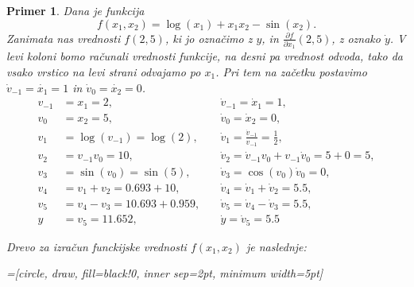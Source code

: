 \documentclass[12pt,slovene]{article}
\newtheorem{primer}{Primer}
\begin{document}
\begin{primer}\label{260522-0821}
Dana je funkcija
    $$f(x_{1},x_{2})=\log(x_{1})+x_{1}x_{2}-\sin(x_{2}).$$ 
Zanimata nas vrednosti $f(2,5)$, ki jo označimo z $y$, in $\frac{\partial{f}}{\partial{x_{1}}}(2,5)$, z oznako $\dot{y}$.
V levi koloni bomo računali vrednosti funkcije, na desni pa vrednost odvoda, tako da vsako vrstico na levi strani odvajamo po $x_1$. Pri tem na začetku postavimo 
$\dot{v}_{-1}=\dot{x_1}=1$ in $\dot{v}_0=\dot{x_2}=0$.
\begin{align*}
    v_{-1}  &=x_{1}   
    =2,\quad
    &\dot{v}_{-1}
            =\dot{x}_{1}  =1,\\
    v_{0}     &= x_{2}  =5,\quad
    &\dot{v}_{0}= \dot{x}_{2} =0,\\
    v_{1}     &= \log(v_{-1})  =\log(2),\quad
    &\dot{v}_{1}= \frac{\dot{v}_{-1}}{v_{-1}}                =\frac{1}{2},\\
    v_{2}     &= v_{-1}v_{0}  =10,\quad
    &\dot{v}_{2}= \dot{v}_{-1} v_{0}+
                v_{-1}\dot{v}_{0} 
                =5+0=5,\\
    v_{3}     &= \sin(v_0)  =\sin(5),\quad
    &\dot{v}_{3}= \cos(v_0)\dot{v}_0 =0,\\
    v_{4}     &= v_1+v_2  =0.693+10,\quad
    &\dot{v}_{4}= \dot{v}_1+\dot{v}_2 =5.5,\\
    v_{5}     &= v_4-v_3  =10.693+0.959,\quad
    &\dot{v}_{5}= \dot{v}_{4}-\dot{v}_3 =5.5,\\
    y&=v_5=11.652,\quad 
    &\dot{y}=\dot{v}_5=5.5
\end{align*}

Drevo za izračun funckijske vrednosti $f(x_1,x_2)$ je naslednje:
\begin{center}
    =[circle, draw, fill=black!0, inner sep=2pt, minimum width=5pt]
    
\end{center}
\end{primer}
\end{document}

